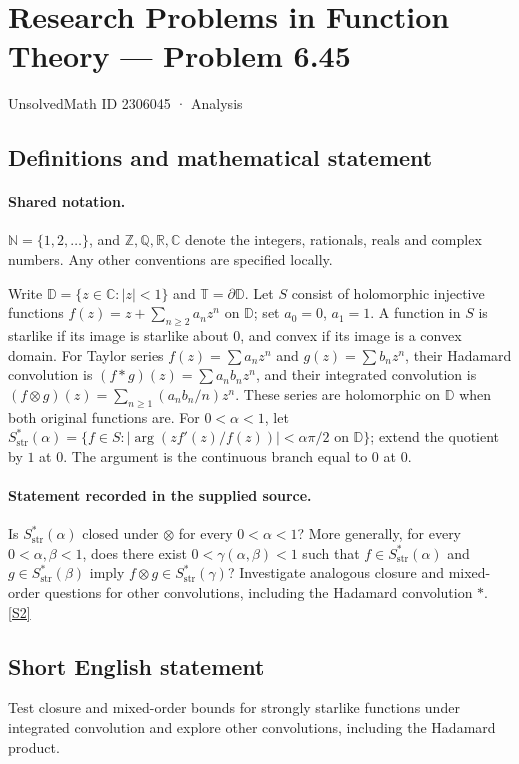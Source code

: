\documentclass[11pt]{article}
\newcommand{\sref}[2]{\hyperlink{source:#1:#2}{[S#2]}}
\begin{document}
\setcounter{section}{2306044}
\section{Research Problems in Function Theory — Problem 6.45}\label{2306045}
{\small\sffamily UnsolvedMath ID 2306045 · Analysis}
\subsection{Definitions and mathematical statement}

\paragraph{Shared notation.}$\mathbb N=\{1,2,\ldots\}$, and $\mathbb Z,\mathbb Q,\mathbb R,\mathbb C$ denote the integers, rationals, reals and complex numbers. Any other conventions are specified locally.


Write $\mathbb D=\{z\in\mathbb C:|z|<1\}$ and $\mathbb T=\partial\mathbb D$. Let $S$ consist of holomorphic injective functions $f(z)=z+\sum_{n\ge2}a_nz^n$ on $\mathbb D$; set $a_0=0$, $a_1=1$. A function in $S$ is starlike if its image is starlike about $0$, and convex if its image is a convex domain. For Taylor series $f(z)=\sum a_nz^n$ and $g(z)=\sum b_nz^n$, their Hadamard convolution is $(f*g)(z)=\sum a_nb_nz^n$, and their integrated convolution is $(f\otimes g)(z)=\sum_{n\ge1}(a_nb_n/n)z^n$. These series are holomorphic on $\mathbb D$ when both original functions are. For $0<\alpha<1$, let $S^*_{\mathrm{str}}(\alpha)=\{f\in S:|\arg(zf'(z)/f(z))|<\alpha\pi/2\text{ on }\mathbb D\}$; extend the quotient by $1$ at $0$. The argument is the continuous branch equal to $0$ at $0$.
\paragraph{Statement recorded in the supplied source.}
Is $S^*_{\mathrm{str}}(\alpha)$ closed under $\otimes$ for every $0<\alpha<1$? More generally, for every $0<\alpha,\beta<1$, does there exist $0<\gamma(\alpha,\beta)<1$ such that $f\in S^*_{\mathrm{str}}(\alpha)$ and $g\in S^*_{\mathrm{str}}(\beta)$ imply $f\otimes g\in S^*_{\mathrm{str}}(\gamma)$? Investigate analogous closure and mixed-order questions for other convolutions, including the Hadamard convolution $*$. \sref{2306045}{2}
\subsection{Short English statement}
Test closure and mixed-order bounds for strongly starlike functions under integrated convolution and explore other convolutions, including the Hadamard product.
\end{document}

